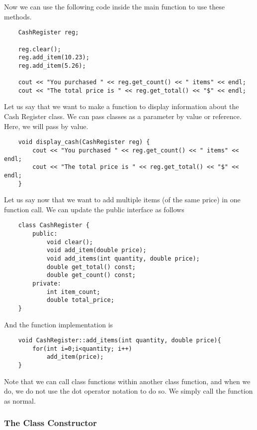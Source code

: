 \documentclass[]{article}
\begin{document}
Now we can use the following code inside the main function to use these methods.\\

\begin{lstlisting}
	CashRegister reg;
	
	reg.clear();
	reg.add_item(10.23);
	reg.add_item(5.26);
	
	cout << "You purchased " << reg.get_count() << " items" << endl; 
	cout << "The total price is " << reg.get_total() << "$" << endl; 
\end{lstlisting}\bigbreak

Let us say that we want to make a function to display information about the Cash Register class. We can pass classes as a parameter by value or reference. Here, we will pass by value.

\begin{lstlisting}
	void display_cash(CashRegister reg) {
		cout << "You purchased " << reg.get_count() << " items" << endl; 
		cout << "The total price is " << reg.get_total() << "$" << endl; 	
	}
\end{lstlisting}\bigbreak

Let us say now that we want to add multiple items (of the same price) in one function call. We can update the public interface as follows

\begin{lstlisting}
	class CashRegister {
		public:
			void clear();
			void add_item(double price);
			void add_items(int quantity, double price);
			double get_total() const;
			double get_count() const;
		private:
			int item_count;
			double total_price;
	}
\end{lstlisting}\bigbreak

And the function implementation is

\begin{lstlisting}
	void CashRegister::add_items(int quantity, double price){
		for(int i=0;i<quantity; i++)
			add_item(price);
	}
\end{lstlisting}\bigbreak

Note that we can call class functions within another class function, and when we do, we do not use the dot operator notation to do so. We simply call the function as normal.


\subsubsection{The Class Constructor}
\bigbreak
\end{document}
